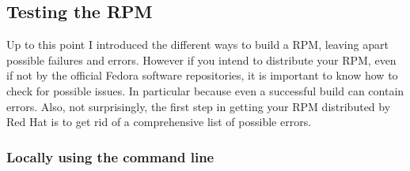 \newpage
\subsection{Testing the RPM}
\label{rpmtesting}

Up to this point I introduced the different ways to build a RPM, leaving apart possible failures and errors. 
However if you intend to distribute your RPM, even if not by the official Fedora software repositories, it is important to know 
how to check for possible issues. In particular because even a successful build can contain errors.  
Also, not surprisingly, the first step in getting your RPM distributed by Red Hat is to get rid of 
a comprehensive list of possible errors. 

\subsubsection{Locally using the command line}

